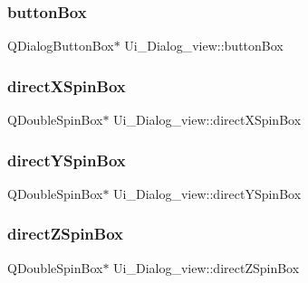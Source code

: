 \subsubsection{\texorpdfstring{button\+Box}{buttonBox}}
{\footnotesize\ttfamily Q\+Dialog\+Button\+Box$\ast$ Ui\+\_\+\+Dialog\+\_\+view\+::button\+Box}

\hypertarget{class_ui___dialog__view_a24813e55f1437289dd4cdd90780dded6}{}\label{class_ui___dialog__view_a24813e55f1437289dd4cdd90780dded6} 
\subsubsection{\texorpdfstring{direct\+X\+Spin\+Box}{directXSpinBox}}
{\footnotesize\ttfamily Q\+Double\+Spin\+Box$\ast$ Ui\+\_\+\+Dialog\+\_\+view\+::direct\+X\+Spin\+Box}

\hypertarget{class_ui___dialog__view_a96ef0cc5874bf7279969cc8a42ab4638}{}\label{class_ui___dialog__view_a96ef0cc5874bf7279969cc8a42ab4638} 
\subsubsection{\texorpdfstring{direct\+Y\+Spin\+Box}{directYSpinBox}}
{\footnotesize\ttfamily Q\+Double\+Spin\+Box$\ast$ Ui\+\_\+\+Dialog\+\_\+view\+::direct\+Y\+Spin\+Box}

\hypertarget{class_ui___dialog__view_aec4dbf7f3b1f9d0491fcd20d31767881}{}\label{class_ui___dialog__view_aec4dbf7f3b1f9d0491fcd20d31767881} 
\subsubsection{\texorpdfstring{direct\+Z\+Spin\+Box}{directZSpinBox}}
{\footnotesize\ttfamily Q\+Double\+Spin\+Box$\ast$ Ui\+\_\+\+Dialog\+\_\+view\+::direct\+Z\+Spin\+Box}

\hypertarget{class_ui___dialog__view_ae5840f6fd0b53493f85a37dcef58c403}{}\label{class_ui___dialog__view_ae5840f6fd0b53493f85a37dcef58c403} 
